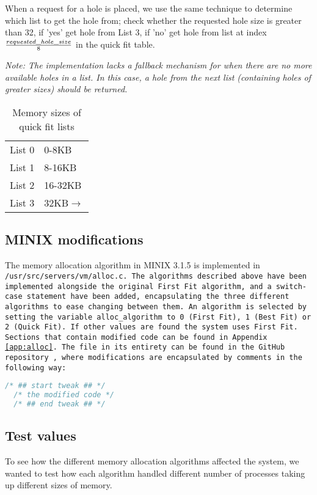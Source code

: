 \documentclass[11pt]{article}
\begin{document}
When a request for a hole is placed, we use the same technique to determine which list to get the hole from; check whether the requested hole size is greater than 32, if 'yes' get hole from List 3, if 'no' get hole from list at index $requested\_hole\_size \over 8$ in the quick fit table.

\emph{Note: The implementation lacks a fallback mechanism for when there are no more available holes in a list. In this case, a hole from the next list (containing holes of greater sizes) should be returned.}

\begin{table}[H]
	\begin{center}
		\begin{tabular}{ r | l }
		List 0 & 0-8KB\\
		List 1 & 8-16KB\\
		List 2 & 16-32KB\\
		List 3 & 32KB$\rightarrow$
		\end{tabular}
	  
	  \caption{Memory sizes of quick fit lists}
	  \label{tab:list_sizes}
	\end{center}
\end{table}

\subsection{MINIX modifications}
The memory allocation algorithm in MINIX 3.1.5 is implemented in \\
\tt/usr/src/servers/vm/alloc.c\normalfont. The algorithms described above have been implemented alongside the original First Fit algorithm, and a switch-case statement have been added, encapsulating the three different algorithms to ease changing between them. An algorithm is selected by setting the variable \tt alloc\_algorithm \normalfont to 0 (First Fit), 1 (Best Fit) or 2 (Quick Fit). If other values are found the system uses First Fit. Sections that contain modified code can be found in Appendix \ref{app:alloc}. The file in its entirety can be found in the GitHub repository \cite{github}, where modifications are encapsulated by comments in the following way:\\
\begin{lstlisting}[language=c]
  /* ## start tweak ## */
  /* the modified code */
  /* ## end tweak ## */
\end{lstlisting}

\subsection{Test values}
To see how the different memory allocation algorithms affected the system, we wanted to test how each algorithm handled different number of processes taking up different sizes of memory.
\end{document}
